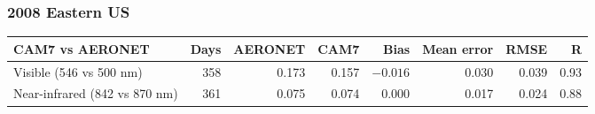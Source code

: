 \begin{frame}[t]
\frametitle{2008 Eastern US}
\centering
{}\hfill
{}\par
\vspace{0.15cm}
\hfill
{}\par
\vspace{0.1cm}
{\tiny\setlength{\tabcolsep}{5pt}
\begin{tabular}{@{}lrrrrrrr@{}}
\toprule
CAM7 vs AERONET & Days & AERONET & CAM7 & Bias & Mean error & RMSE & R \\
\midrule
Visible (546 vs 500 nm) & 358 & 0.173 & 0.157 & $-0.016$ & 0.030 & 0.039 & 0.93 \\
Near-infrared (842 vs 870 nm) & 361 & 0.075 & 0.074 & $0.000$ & 0.017 & 0.024 & 0.88 \\
\bottomrule
\end{tabular}\par}
\end{frame}
